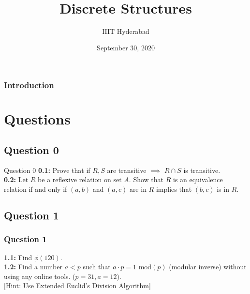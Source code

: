 \documentclass[xcolor=svgnames]{beamer}
\title[Discrete Structures]{Discrete Structures} %
\author{IIIT Hyderabad} %
\institute[] %
{
Monsoon 2020 \\ %
\medskip
\textit{Tutorial 5} %
}
\date{September 30, 2020} %
\begin{document}
\begin{frame}
\titlepage %
\end{frame}

\begin{frame}
\frametitle{Introduction} %
\tableofcontents %
\end{frame}



\section{Questions}

\subsection{Question 0}
\begin{frame}{Question 0}
    \textbf{0.1:} Prove that if $R,S$ are transitive $\implies$ $R \cap S$ is transitive.
    \\ \textbf{0.2:} Let $R$ be a reflexive relation on set $A$. Show that $R$ is an equivalence relation if and only if $(a, b)$ and $(a, c)$ are in $R$ implies that $(b,c)$ is in $R$.
\end{frame}

\subsection{Question 1}
\begin{frame}
\frametitle{Question 1}
\textbf{1.1: } Find $\phi(120)$.
\\ \textbf{1.2: } Find a number $a < p$ such that $a \cdot p = 1 \text{ mod}(p)$ (modular inverse) without using any online tools. ($p = 31, a = 12$). 
\\ $[$Hint: Use Extended Euclid's Division Algorithm]
\end{frame}
\end{document}
